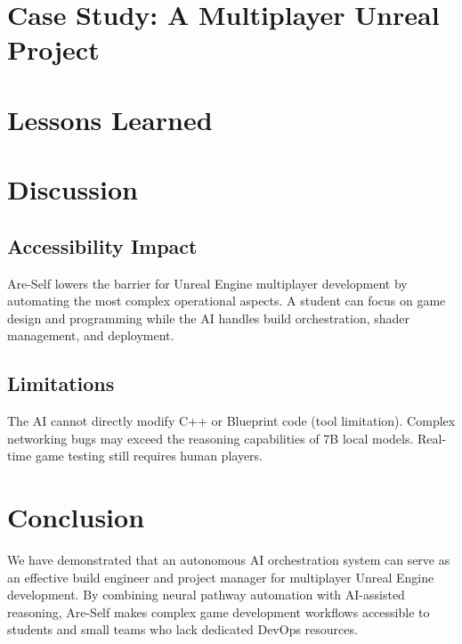\documentclass[man,12pt,floatsintext]{apa7}
\begin{document}

\section{Case Study: A Multiplayer Unreal Project}


\section{Lessons Learned}


\section{Discussion}

\subsection{Accessibility Impact}

Are-Self lowers the barrier for Unreal Engine multiplayer development by automating the
most complex operational aspects. A student can focus on game design and programming while
the AI handles build orchestration, shader management, and deployment.

\subsection{Limitations}

The AI cannot directly modify C++ or Blueprint code (tool limitation). Complex
networking bugs may exceed the reasoning capabilities of 7B local models. Real-time
game testing still requires human players.

\section{Conclusion}

We have demonstrated that an autonomous AI orchestration system can serve as an effective
build engineer and project manager for multiplayer Unreal Engine development. By combining
neural pathway automation with AI-assisted reasoning, Are-Self makes complex game
development workflows accessible to students and small teams who lack dedicated DevOps
resources.

\printbibliography
\end{document}
